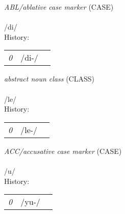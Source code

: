 \twocolumn
\vspace{15pt}
\begin{nopagebreak}
 \textit{ABL/ablative case marker} (CASE)\\
\\
\noindent /d{\textprimstress}i/\\


\noindent History:

\vspace{-0pt}
\hspace{40pt}
\begin{tabular}{ccc}
\textit{0} & /di-/& \\
\end{tabular}

\vspace{20pt}\hline

\end{nopagebreak}
\filbreak



\vspace{15pt}
\begin{nopagebreak}
 \textit{abstract noun class} (CLASS)\\
\\
\noindent /l{\textprimstress}e/\\


\noindent History:

\vspace{-0pt}
\hspace{40pt}
\begin{tabular}{ccc}
\textit{0} & /le-/& \\
\end{tabular}

\vspace{20pt}\hline

\end{nopagebreak}
\filbreak



\vspace{15pt}
\begin{nopagebreak}
 \textit{ACC/accusative case marker} (CASE)\\
\\
\noindent /{\textprimstress}u/\\


\noindent History:

\vspace{-0pt}
\hspace{40pt}
\begin{tabular}{ccc}
\textit{0} & /yu-/& \\
\end{tabular}

\vspace{20pt}\hline

\end{nopagebreak}
\filbreak



